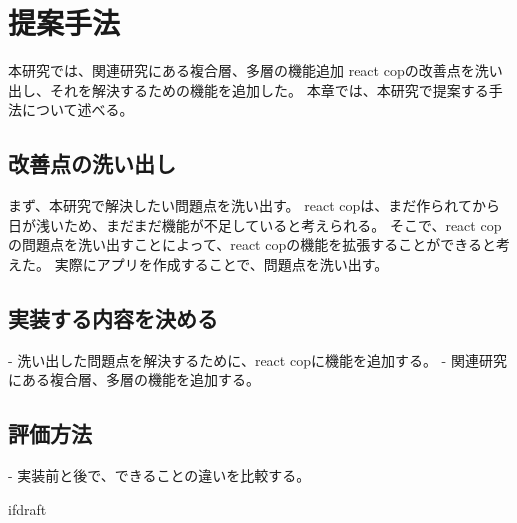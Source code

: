 \documentclass{jsarticle}
\begin{document}
    \fi
    \section{提案手法}
    本研究では、関連研究にある複合層、多層の機能追加
    react copの改善点を洗い出し、それを解決するための機能を追加した。
    本章では、本研究で提案する手法について述べる。

    \subsection{改善点の洗い出し}
    まず、本研究で解決したい問題点を洗い出す。
    react copは、まだ作られてから日が浅いため、まだまだ機能が不足していると考えられる。
    そこで、react copの問題点を洗い出すことによって、react copの機能を拡張することができると考えた。
    実際にアプリを作成することで、問題点を洗い出す。

    \subsection{実装する内容を決める}
    - 洗い出した問題点を解決するために、react copに機能を追加する。
    - 関連研究にある複合層、多層の機能を追加する。

    \subsection{評価方法}
    - 実装前と後で、できることの違いを比較する。
















    \expandafter\ifx\csname ifdraft\endcsname\relax
\end{document}
